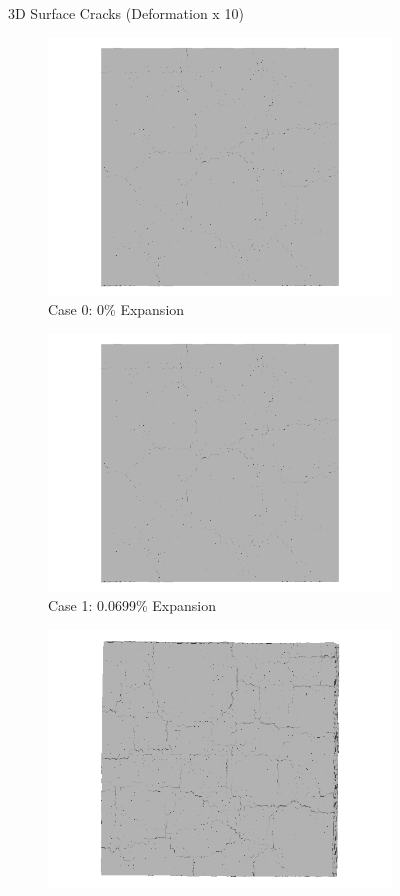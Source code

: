 \begin{figure}[!h]
  \caption{3D Surface Cracks (Deformation x 10)}
  \label{fig:ASR_A15P75_3D}
\end{figure}

\begin{figure}[!h]
\centering

    \begin{subfigure}{.5\textwidth}
      \centering
      \includegraphics[width=.8\linewidth]{Files/exp_3D/ASR/A15P75_1_3ds.png}
    \caption{Case 0: 0\% Expansion}
    \end{subfigure}%
    \begin{subfigure}{.5\textwidth}
      \centering
      \includegraphics[width=.8\linewidth]{Files/exp_3D/ASR/A15P75_1_3ds.png}
    \caption{Case 1: 0.0699\% Expansion}
    \end{subfigure}
    \begin{subfigure}{.5\textwidth}
      \centering
      \includegraphics[width=.8\linewidth]{Files/exp_3D/ASR/A15P75_2_3ds.png}

\end{subfigure}
\end{figure}
